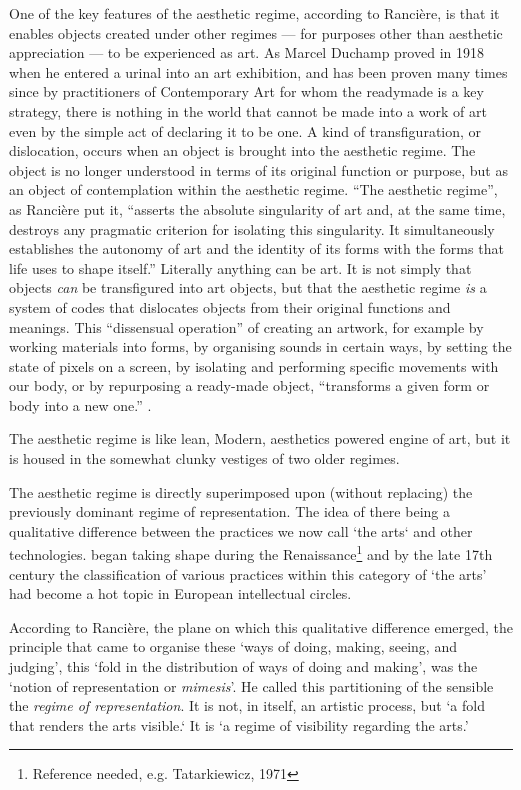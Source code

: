 \documentclass[letterpaper]{article}
\begin{document}
    One of the key features of the aesthetic regime, according to Rancière, is that it enables objects created under other regimes — for purposes other than aesthetic appreciation — to be experienced as art. As Marcel Duchamp proved in 1918 when he entered a urinal into an art exhibition, and has been proven many times since by practitioners of Contemporary Art for whom the readymade is a key strategy, there is nothing in the world that cannot be made into a work of art even by the simple act of declaring it to be one. A kind of transfiguration, or dislocation, occurs when an object is brought into the aesthetic regime. The object is no longer understood in terms of its original function or purpose, but as an object of contemplation within the aesthetic regime. “The aesthetic regime”, as Rancière put it, “asserts the absolute singularity of art and, at the same time, destroys any pragmatic criterion for isolating this singularity. It simultaneously establishes the autonomy of art and the identity of its forms with the forms that life uses to shape itself.” Literally anything can be art. It is not simply that objects \emph{can} be transfigured into art objects, but that the aesthetic regime \emph{is} a system of codes that dislocates objects from their original functions and meanings. This “dissensual operation” of creating an artwork, for example by working materials into forms, by organising sounds in certain ways, by setting the state of pixels on a screen, by isolating and performing specific movements with our body, or by repurposing a ready-made object, “transforms a given form or body into a new one.” \citep[p.54]{RancierThEmncptdSpcttr2009}.

    The aesthetic regime is like lean, Modern, aesthetics powered engine of art, but it is housed in the somewhat clunky vestiges of two older regimes.

    The aesthetic regime is directly superimposed upon (without replacing) the previously dominant regime of representation. The idea of there being a qualitative difference between the practices we now call ‘the arts‘ and other technologies. began taking shape during the Renaissance\footnote{Reference needed, e.g. Tatarkiewicz, 1971} and by the late 17th century the classification of various practices within this category of ‘the arts’ had become a hot topic in European intellectual circles.

    According to Rancière, the plane on which this qualitative difference emerged, the principle that came to organise these ‘ways of doing, making, seeing, and judging’, this ‘fold in the distribution of ways of doing and making’, was the ‘notion of representation or \emph{mimesis}’. He called this partitioning of the sensible the \emph{regime of representation}\citep[p.22]{RancierPltcsOfThAsthtcs2004}. It is not, in itself, an artistic process, but ‘a fold that renders the arts visible.‘ It is  ‘a regime of visibility regarding the arts.’
    
\end{document}
